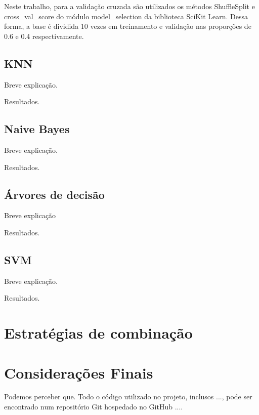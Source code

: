 \documentclass[conference]{IEEEtran}
\begin{document}
Neste trabalho, para a validação cruzada são utilizados os métodos ShuffleSplit
e cross\_val\_score do módulo model\_selection da biblioteca SciKit Learn. Dessa
forma, a base é dividida 10 vezes em treinamento e validação nas proporções de
0.6 e 0.4 respectivamente.

\subsection{KNN}

Breve explicação.

Resultados.

\subsection{Naive Bayes}

Breve explicação.

Resultados.

\subsection{Árvores de decisão}

Breve explicação

Resultados.

\subsection{SVM}

Breve explicação.

Resultados.

\section{Estratégias de combinação}


\section{Considerações Finais}

Podemos perceber que.
Todo o código utilizado no projeto, inclusos ..., pode ser encontrado num
repositório Git hospedado no GitHub ....
\end{document}
